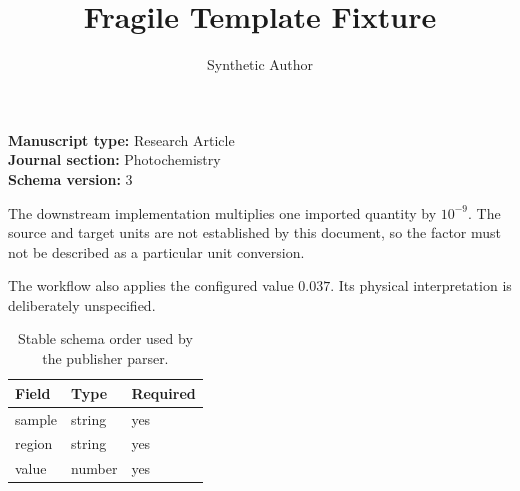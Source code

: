 \documentclass[10pt]{article}
\title{Fragile Template Fixture}
\author{Synthetic Author}
\date{}
\newcommand{\ManuscriptType}{Research Article}
\newcommand{\JournalSection}{Photochemistry}
\newcommand{\SchemaVersion}{3}
\newcommand{\ConfiguredFactor}{10^{-9}}
\newcommand{\UnknownCorrection}{0.037}
\begin{document}
\maketitle

\noindent
\textbf{Manuscript type:} \ManuscriptType\\
\textbf{Journal section:} \JournalSection\\
\textbf{Schema version:} \SchemaVersion

\vspace{0.8em}

The downstream implementation multiplies one imported quantity by
$\ConfiguredFactor$. The source and target units are not established by
this document, so the factor must not be described as a particular unit
conversion.

The workflow also applies the configured value
$\UnknownCorrection$. Its physical interpretation is deliberately
unspecified.

\begin{table}[ht]
\centering
\caption{Stable schema order used by the publisher parser.}
\begin{tabular}{lll}
\toprule
Field & Type & Required \\
\midrule
sample & string & yes \\
region & string & yes \\
value & number & yes \\
\bottomrule
\end{tabular}
\end{table}

\vspace{-0.4em}
\end{document}
